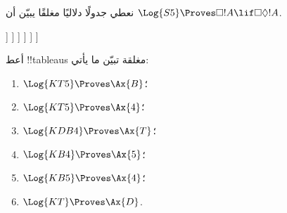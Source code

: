 \documentclass[../../../include/open-logic-section]{subfiles}
\begin{document}
\begin{ex}
  نعطي جدولًا دلاليًا مغلقًا يبيّن أن $\Log{S5} \Proves
  \Box!A \lif \Box\Diamond!A$.
  \begin{oltableau}
    [\pFmla{\False}{\Box\formula{A} \lif \Box\Diamond \formula{A}}{1},
      just = \TAss
      [\pFmla{\True}{\Box \formula{A}}{1}, just = {\TRule{\False}{\lif}[1]}
        [\pFmla{\False}{\Box\Diamond \formula{A}}{1},
          just = {\TRule{\False}{\lif}[1]}
          [\pFmla{\False}{\Diamond \formula{A}}{1.1},
            just = {\TRule{\False}{\Box}[3]}
            [\pFmla{\False}{\Diamond \formula{A}}{1},
              just = {4r$\Diamond$ 4}
              [\pFmla{\False}{\formula{A}}{1.1},
                just = {\TRule{\False}{\Diamond}[5]}
                [\pFmla{\True}{\formula{A}}{1.1},
                  just = {\TRule{\True}{\Box}[2]}, close]
              ]
            ]
          ]
        ]
      ]
    ]
  \end{oltableau}
\end{ex}

\begin{prob}
أعط !!{tableau}s مغلقة تبيّن ما يأتي:
  \begin{enumerate}
  \item $\Log{KT5} \Proves \Ax{B}$؛
  \item $\Log{KT5} \Proves \Ax{4}$؛
  \item $\Log{KDB4} \Proves \Ax{T}$؛
  \item $\Log{KB4} \Proves \Ax{5}$؛
  \item $\Log{KB5} \Proves \Ax{4}$؛
  \item $\Log{KT} \Proves \Ax{D}$.
  \end{enumerate}
\end{prob}
\end{document}
